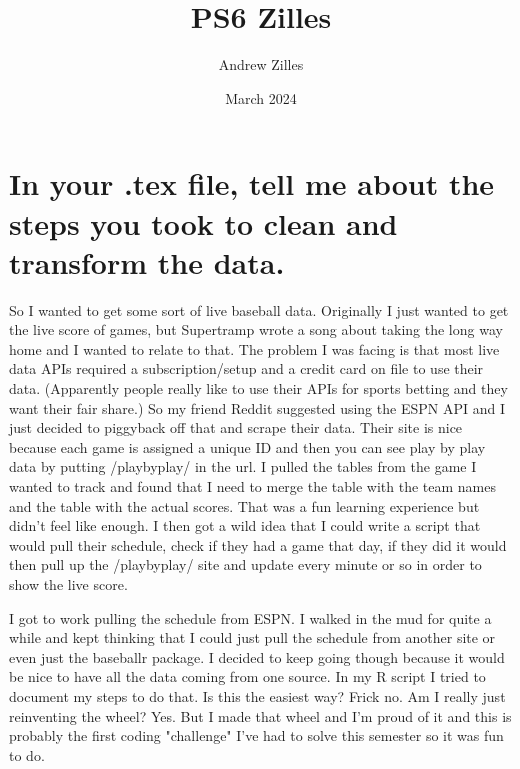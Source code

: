 \documentclass{article}
\title{PS6 Zilles}
\author{Andrew Zilles}
\date{March 2024}
\begin{document}
\maketitle

\section{In your .tex file, tell me about the steps you took to clean and transform the data.
}
So I wanted to get some sort of live baseball data. Originally I just wanted to get the live score of games, but Supertramp wrote a song about taking the long way home and I wanted to relate to that. The problem I was facing is that most live data APIs required a subscription/setup and a credit card on file to use their data. (Apparently people really like to use their APIs for sports betting and they want their fair share.) So my friend Reddit suggested using the ESPN API and I just decided to piggyback off that and scrape their data. Their site is nice because each game is assigned a unique ID and then you can see play by play data by putting /playbyplay/ in the url. I pulled the tables from the game I wanted to track and found that I need to merge the table with the team names and the table with the actual scores. That was a fun learning experience but didn't feel like enough. I then got a wild idea that I could write a script that would pull their schedule, check if they had a game that day, if they did it would then pull up the /playbyplay/ site and update every minute or so in order to show the live score.

I got to work pulling the schedule from ESPN. I walked in the mud for quite a while and kept thinking that I could just pull the schedule from another site or even just the baseballr package. I decided to keep going though because it would be nice to have all the data coming from one source. In my R script I tried to document my steps to do that. Is this the easiest way? Frick no. Am I really just reinventing the wheel? Yes. But I made that wheel and I'm proud of it and this is probably the first coding "challenge" I've had to solve this semester so it was fun to do.
\end{document}
